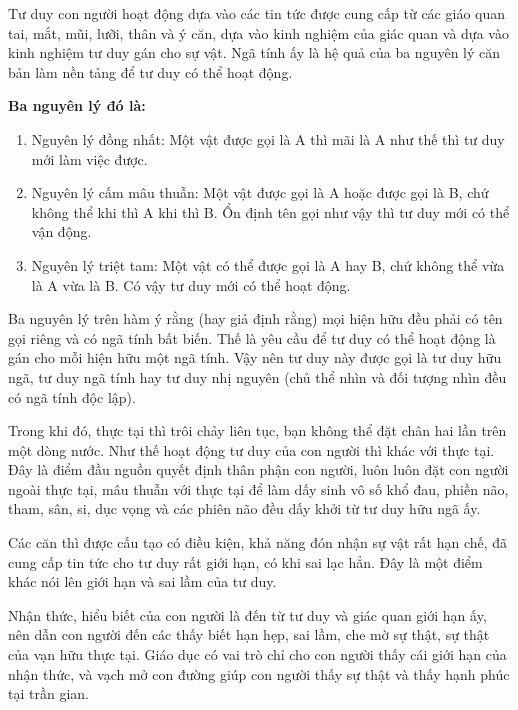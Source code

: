 Tư duy con người hoạt động dựa vào các tin tức được cung cấp từ các giáo quan tai, mắt, mũi, lưỡi, thân và ý căn, dựa vào kinh nghiệm của giác quan và dựa vào kinh nghiệm tư duy gán cho sự vật. Ngã tính ấy là hệ quả của ba nguyên lý căn bản làm nền tảng để tư duy có thể hoạt động.

{\bf Ba nguyên lý đó là:}

\begin{enumerate}[label=\itshape\arabic*\upshape/]
    \item Nguyên lý đồng nhất: Một vật được gọi là A thì mãi là A như thế thì tư duy mới làm việc được.

    \item Nguyên lý cấm mâu thuẫn: Một vật được gọi là A hoặc được gọi là B, chứ không thể khi thì A khi thì B. Ổn định tên gọi như vậy thì tư duy mới có thể vận động.

    \item Nguyên lý triệt tam: Một vật có thể được gọi là A hay B, chứ không thể vừa là A vừa là B. Có vậy tư duy mới có thể hoạt động.
\end{enumerate}

Ba nguyên lý trên hàm ý rằng (hay giả định rằng) mọi hiện hữu đều phải có tên gọi riêng và có ngã tính bất biến. Thế là yêu cầu để tư duy có thể hoạt động là gán cho mỗi hiện hữu một ngã tính. Vậy nên tư duy này được gọi là tư duy hữu ngã, tư duy ngã tính hay tư duy nhị nguyên (chủ thể nhìn và đối tượng nhìn đều có ngã tính độc lập).

Trong khi đó, thực tại thì trôi chảy liên tục, bạn không thể đặt chân hai lần trên một dòng nước. Như thế hoạt động tư duy của con người thì khác với thực tại. Đây là điểm đầu nguồn quyết định thân phận con người, luôn luôn đặt con người ngoài thực tại, mâu thuẫn với thực tại để làm dấy sinh vô số khổ đau, phiền não, tham, sân, si, dục vọng và các phiên não đều dấy khởi từ tư duy hữu ngã ấy.

Các căn thì được cấu tạo có điều kiện, khả năng đón nhận sự vật rất hạn chế, đã cung cấp tin tức cho tư duy rất giới hạn, có khi sai lạc hẳn. Đây là một điểm khác nói lên giới hạn và sai lầm của tư duy.

Nhận thức, hiểu biết của con người là đến từ tư duy và giác quan giới hạn ấy, nên dẫn con người đến các thấy biết hạn hẹp, sai lầm, che mờ sự thật, sự thật của vạn hữu thực tại. Giáo dục có vai trò chỉ cho con người thấy cái giới hạn của nhận thức, và vạch mở con đường giúp con người thấy sự thật và thấy hạnh phúc tại trần gian.


